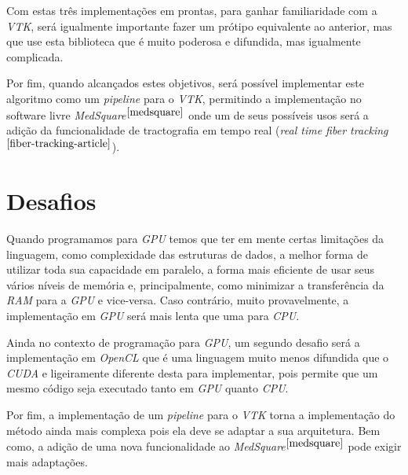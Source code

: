 Com estas três implementações em prontas, para ganhar familiaridade com a \textit{VTK}, será igualmente importante fazer um prótipo equivalente ao anterior, mas que use esta biblioteca que é muito poderosa e difundida, mas igualmente complicada.

Por fim, quando alcançados estes objetivos, será possível implementar este algoritmo como um \textit{pipeline} para o \textit{VTK}, permitindo a implementação no software livre \textit{MedSquare}$^{\ref{medsquare}}$ onde um de seus possíveis usos será a adição da funcionalidade de tractografia em tempo real (\textit{real time fiber tracking}$^{\ref{fiber-tracking-article}}$).

\section{Desafios}
Quando programamos para \textit{GPU} temos que ter em mente certas limitações da linguagem, como complexidade das estruturas de dados, a melhor forma de utilizar toda sua capacidade em paralelo, a forma mais eficiente de usar seus vários níveis de memória e, principalmente, como minimizar a transferência da \textit{RAM} para a \textit{GPU} e vice-versa. Caso contrário, muito provavelmente, a implementação em \textit{GPU} será mais lenta que uma para \textit{CPU}.

Ainda no contexto de programação para \textit{GPU}, um segundo desafio será a implementação em \textit{OpenCL} que é uma linguagem muito menos difundida que o \textit{CUDA} e ligeiramente diferente desta para implementar, pois permite que um mesmo código seja executado tanto em \textit{GPU} quanto \textit{CPU}.

Por fim, a implementação de um \textit{pipeline} para o \textit{VTK} torna a implementação do método ainda mais complexa pois ela deve se adaptar a sua arquitetura. Bem como, a adição de uma nova funcionalidade ao \textit{MedSquare}$^{\ref{medsquare}}$ pode exigir mais adaptações.
